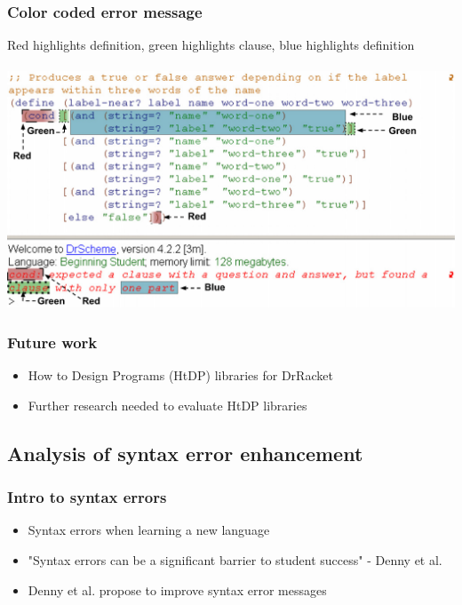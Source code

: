 \documentclass{beamer}
\begin{document}
\begin{frame}
	\frametitle{Color coded error message}
	Red highlights definition, green highlights clause, blue highlights definition \\~\\
		\includegraphics[keepaspectratio, width=0.85\paperwidth]{ColorCodedMessage.pdf}
		\\
\end{frame}

\begin{frame}
	\frametitle{Future work}
		\begin{itemize}
			\item How to Design Programs (HtDP) libraries for DrRacket
			\item Further research needed to evaluate HtDP libraries
		\end{itemize}

\end{frame}

\subsection[Syntax error enhancement]{Analysis of syntax error enhancement}

\begin{frame}
	\frametitle{Intro to syntax errors}
		\begin{itemize}
			\item Syntax errors when learning a new language
			\item "Syntax errors can be a significant barrier to student success"  - Denny et al.
			\item Denny et al. propose to improve syntax error messages
		\end{itemize}

\end{frame}
\end{document}
